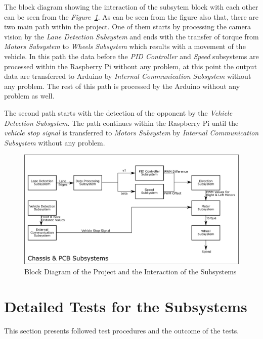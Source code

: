 \documentclass[a4paper,12pt]{article}
\begin{document}
	The block diagram showing the interaction of the subsytem block with each other can be seen from the \textit{Figure~\ref{fig:subsys-block}}. As can be seen from the figure also that, there are two main path within the project. One of them starts by processing the camera vision by the \textit{Lane Detection Subsystem} and ends with the transfer of torque from \textit{Motors Subsystem} to \textit{Wheels Subsystem} which results with a movement of the vehicle. In this path the data before the \textit{PID Controller} and \textit{Speed} subsystems are processed within the Raspberry Pi without any problem, at this point the output data are transferred to Arduino by \textit{Internal Communication Subsystem} without any problem. The rest of this path is processed by the Arduino without any problem as well.

	The second path starts with the detection of the opponent by the \textit{Vehicle Detection Subsystem}. The path continues within the Raspberry Pi until the \textit{vehicle stop signal} is transferred to \textit{Motors Subsystem} by \textit{Internal Communication Subsystem} without any problem.

	\begin{figure}[h]
		\includegraphics[width=\textwidth,center]{images/subsys_block.png}
		\caption{Block Diagram of the Project and the Interaction of the Subsystems}\label{fig:subsys-block}
	\end{figure}







\section{Detailed Tests for the Subsystems}\label{test_sec}
	This section presents followed test procedures and the outcome of the tests.
\end{document}
